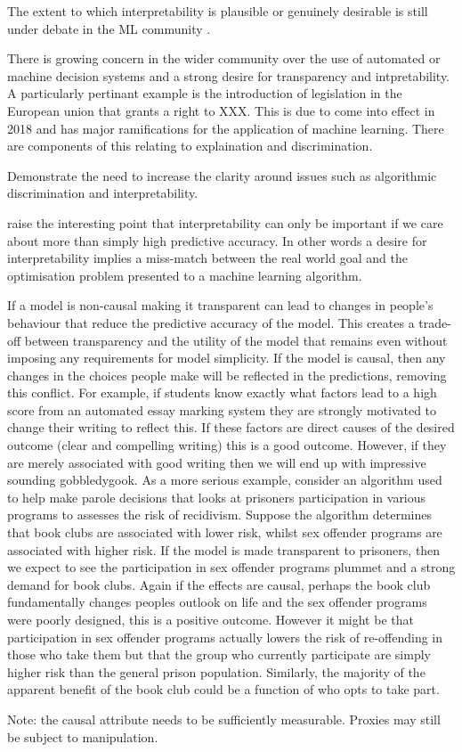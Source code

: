 \documentclass{article}
\theoremstyle{plain}
\theoremstyle{definition}
\begin{document}
The extent to which interpretability is plausible or genuinely desirable is still under debate in the ML community \cite{}. 

There is growing concern in the wider community over the use of automated or machine decision systems and a strong desire for transparency and intpretability. A particularly pertinant example is the introduction of legislation in the European union that grants a right to XXX. This is due to come into effect in 2018 and has major ramifications for the application of machine learning. There are components of this relating to explaination and discrimination. 


Demonstrate the need to increase the clarity around issues such as algorithmic discrimination and interpretability. 

\cite{Lipton2016} raise the interesting point that interpretability can only be important if we care about more than simply high predictive accuracy. In other words a desire for interpretability implies a miss-match between the real world goal and the optimisation problem presented to a machine learning algorithm.

If a model is non-causal making it transparent can lead to changes in people's behaviour that reduce the predictive accuracy of the model. This creates a trade-off between transparency and the utility of the model that remains even without imposing any requirements for model simplicity. If the model is causal, then any changes in the choices people make will be reflected in the predictions, removing this conflict. For example, if students know exactly what factors lead to a high score from an automated essay marking system they are strongly motivated to change their writing to reflect this. If these factors are direct causes of the desired outcome (clear and compelling writing) this is a good outcome. However, if they are merely associated with good writing then we will end up with impressive sounding gobbledygook. As a more serious example, consider an algorithm used to help make parole decisions that looks at prisoners participation in various programs to assesses the risk of recidivism. Suppose the algorithm determines that book clubs are associated with lower risk, whilst sex offender programs are associated with higher risk. If the model is made transparent to prisoners, then we expect to see the participation in sex offender programs plummet and a strong demand for book clubs. Again if the effects are causal, perhaps the book club fundamentally changes peoples outlook on life and the sex offender programs were poorly designed, this is a positive outcome. However it might be that participation in sex offender programs actually lowers the risk of re-offending in those who take them but that the group who currently participate are simply higher risk than the general prison population. Similarly, the majority of the apparent benefit of the book club could be a function of who opts to take part. 

Note: the causal attribute needs to be sufficiently measurable. Proxies may still be subject to manipulation. 
\end{document}
